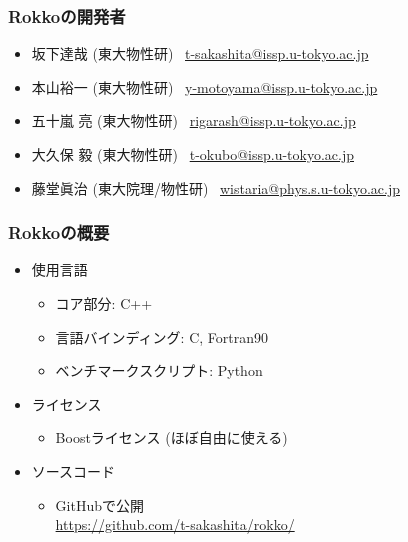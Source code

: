 \begin{frame}
  \frametitle{Rokkoの開発者}
  \begin{itemize}
    \setlength{\itemsep}{1em}
  \item 坂下達哉 (東大物性研) \ \href{mailto:t-sakashita@issp.u-tokyo.ac.jp}{t-sakashita@issp.u-tokyo.ac.jp}
  \item 本山裕一 (東大物性研) \ \href{mailto:y-motoyama@issp.u-tokyo.ac.jp}{y-motoyama@issp.u-tokyo.ac.jp}
  \item 五十嵐 亮 (東大物性研) \ \href{mailto:rigarash@issp.u-tokyo.ac.jp}{rigarash@issp.u-tokyo.ac.jp}
  \item 大久保 毅 (東大物性研) \ \href{mailto:t-okubo@issp.u-tokyo.ac.jp}{t-okubo@issp.u-tokyo.ac.jp}
  \item 藤堂眞治 (東大院理/物性研) \ \href{mailto:wistaria@phys.s.u-tokyo.ac.jp}{wistaria@phys.s.u-tokyo.ac.jp}
  \end{itemize}
\end{frame}

\begin{frame}
  \frametitle{Rokkoの概要}
  \begin{itemize}
  \item 使用言語
    \begin{itemize}
    \item コア部分: C++
    \item 言語バインディング: C, Fortran90
    \item ベンチマークスクリプト: Python
    \end{itemize}
  \item ライセンス
    \begin{itemize}
    \item Boostライセンス (ほぼ自由に使える)
    \end{itemize}
  \item ソースコード
    \begin{itemize}
    \item GitHubで公開\\
          \url{https://github.com/t-sakashita/rokko/}
    \end{itemize}
  \end{itemize}
\end{frame}


